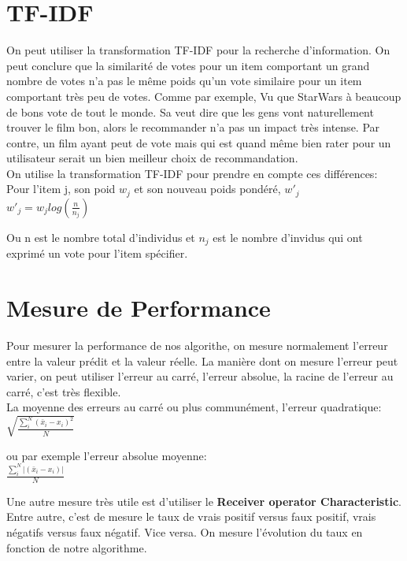 \documentclass[oneside]{book}
\begin{document}
\section{TF-IDF}
On peut utiliser la transformation TF-IDF pour la recherche d'information. On peut conclure que la similarité de votes pour un item comportant un grand nombre de votes n'a pas le même poids qu'un vote similaire pour un item comportant très peu de votes. Comme par exemple, Vu que StarWars à beaucoup de bons vote de tout le monde. Sa veut dire que les gens vont naturellement trouver le film bon, alors le recommander n'a pas un impact très intense. Par contre, un film ayant peut de vote mais qui est quand même bien rater pour un utilisateur serait un bien meilleur choix de recommandation. \\

On utilise la transformation TF-IDF pour prendre en compte ces différences:\\

Pour l'item j, son poid $w_j$ et son nouveau poids pondéré, $w'_j$\\

\centering
$w'_j = w_j log(\frac{n}{n_j})$\\
\justify

Ou n est le nombre total d'individus et $n_j$ est le nombre d'invidus qui ont exprimé un vote pour l'item spécifier. 

\section{Mesure de Performance}
Pour mesurer la performance de nos algorithe, on mesure normalement l'erreur entre la valeur prédit et la valeur réelle. La manière dont on mesure l'erreur peut varier, on peut utiliser l'erreur au carré, l'erreur absolue, la racine de l'erreur au carré, c'est très flexible. \\

La moyenne des erreurs au carré ou plus communément, l'erreur quadratique:\\
\centering
$\sqrt{\frac{\sum\limits_i^N (\bar{x}_i - x_i)^2}{N}}$\\
\justify

ou par exemple l'erreur absolue moyenne:\\

\centering
$\frac{\sum\limits_i^N |(\bar{x}_i - x_i)|}{N}$
\justify

Une autre mesure très utile est d'utiliser le \textbf{Receiver operator Characteristic}. Entre autre, c'est de mesure le taux de vrais positif versus faux positif, vrais négatifs versus faux négatif. Vice versa. On mesure l'évolution du taux en fonction de notre algorithme.
\end{document}
